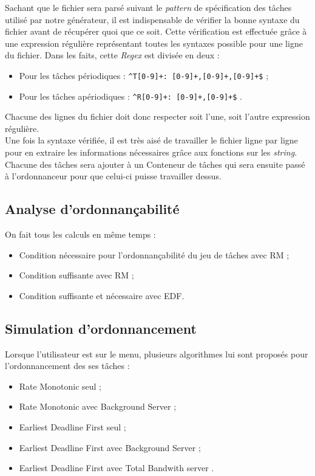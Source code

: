 				Sachant que le fichier sera parsé suivant le \emph{pattern} de spécification des tâches utilisé par notre générateur, il est indispensable de vérifier la bonne syntaxe du fichier avant de récupérer quoi que ce soit. Cette vérification est effectuée grâce à une expression régulière représentant toutes les syntaxes possible pour une ligne du fichier. Dans les faits, cette \emph{Regex} est divisée en deux :
				\begin{itemize}
					\item Pour les tâches périodiques : \verb|^T[0-9]+: [0-9]+,[0-9]+,[0-9]+$| ;
					\item Pour les tâches apériodiques : \verb|^R[0-9]+: [0-9]+,[0-9]+$| .
				\end{itemize}
				Chacune des lignes du fichier doit donc respecter soit l'une, soit l'autre expression régulière.\\
				
				Une fois la syntaxe vérifiée, il est très aisé de travailler le fichier ligne par ligne pour en extraire les informations nécessaires grâce aux fonctions sur les \emph{string}. Chacune des tâches sera ajouter à un Conteneur de tâches qui sera ensuite passé à l'ordonnanceur pour que celui-ci puisse travailler dessus.
			
			\subsection{Analyse d'ordonnançabilité}
				On fait tous les calculs en même temps :
				\begin{itemize}
					\item Condition nécessaire pour l'ordonnançabilité du jeu de tâches avec RM ;
					\item Condition suffisante avec RM ;
					\item Condition suffisante et nécessaire avec EDF.
				\end{itemize}
		
			\subsection{Simulation d'ordonnancement}
				Lorsque l'utilisateur est sur le menu, plusieurs algorithmes lui sont proposés pour l'ordonnancement des ses tâches :
				\begin{itemize}
					\item Rate Monotonic seul ;
					\item Rate Monotonic avec Background Server ;
					\item Earliest Deadline First seul ;
					\item Earliest Deadline First avec Background Server ;
					\item Earliest Deadline First avec Total Bandwith server .
				\end{itemize}
				
